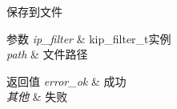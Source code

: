 保存到文件 


\begin{DoxyParams}{参数}
{\em ip\+\_\+filter} & kip\+\_\+filter\+\_\+t实例 \\
\hline
{\em path} & 文件路径 \\
\hline
\end{DoxyParams}

\begin{DoxyRetVals}{返回值}
{\em error\+\_\+ok} & 成功 \\
\hline
{\em 其他} & 失败 \\
\hline
\end{DoxyRetVals}
